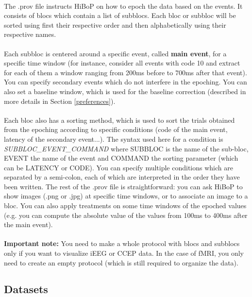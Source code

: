 \documentclass[a4paper]{article}
\begin{document}
\paragraph{} The .prov file instructs HiBoP on how to epoch the data based on the events. It consists of blocs which contain a list of subblocs. Each bloc or subbloc will be sorted using first their respective order and then alphabetically using their respective names.
\paragraph{} Each subbloc is centered around a specific event, called \textbf{main event}, for a specific time window (for instance, consider all events with code 10 and extract for each of them a window ranging from 200ms before to 700ms after that event). You can specify secondary events which do not interfere in the epoching. You can also set a baseline window, which is used for the baseline correction (described in more details in Section \ref{preferences}). 
\paragraph{} Each bloc also has a sorting method, which is used to sort the trials obtained from the epoching according to specific conditions (code of the main event, latency of the secondary event...). The syntax used here for a condition is \textit{SUBBLOC\_EVENT\_COMMAND} where SUBBLOC is the name of the sub-bloc, EVENT the name of the event and COMMAND the sorting parameter (which can be LATENCY or CODE). You can specify multiple conditions which are separated by a semi-colon, each of which are interpreted in the order they have been written. The rest of the .prov file is straightforward: you can ask HiBoP to show images (.png or .jpg) at specific time windows, or to associate an image to a bloc. You can also apply treatments on some time windows of the epoched values (e.g. you can compute the absolute value of the values from 100ms to 400ms after the main event).
\paragraph{} \textbf{Important note:} You need to make a whole protocol with blocs and subblocs only if you want to visualize iEEG or CCEP data. In the case of fMRI, you only need to create an empty protocol (which is still required to organize the data).
\subsection{Datasets}
\end{document}
